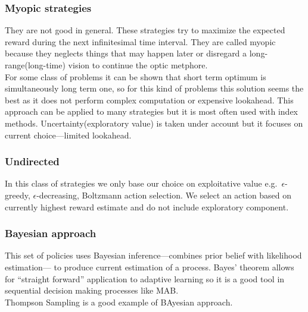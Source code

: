 \documentclass[12pt, a4paper, pdflatex, leqno]{report}
\begin{document}
\subsubsection{Myopic strategies}
They are not good in general. These strategies try to maximize the expected reward during the next infinitesimal time interval. They are called myopic because they neglects things that may happen later or disregard a long-range(long-time) vision to continue the optic metphore.\\

For some class of problems it can be shown that short term optimum is simultaneously long term one, so for this kind of problems this solution seems the best as it does not perform complex computation or expensive lookahead. This approach can be applied to many strategies but it is most often used with index methods. Uncertainty(exploratory value) is taken under account but it focuses on current choice---limited lookahead.\\

\subsubsection{Undirected}
In this class of strategies we only base our choice on exploitative value e.g.\ $\epsilon$-greedy, $\epsilon$-decreasing, Boltzmann action selection. We select an action based on currently highest reward estimate and do not include exploratory component.\\


\subsubsection{Bayesian approach}
This set of policies uses Bayesian inference---combines prior belief with likelihood estimation--- to produce current estimation of a process. Bayes' theorem allows for ``straight forward'' application to adaptive learning so it is a good tool in sequential decision making processes like MAB.\\
Thompson Sampling is a good example of BAyesian approach.\\
\end{document}
